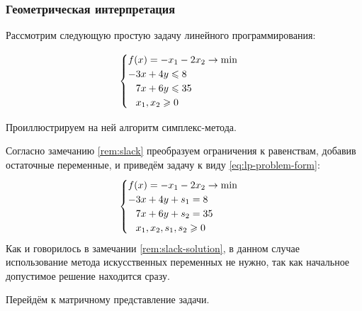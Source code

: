 \subsubsection{Геометрическая интерпретация}

Рассмотрим следующую простую задачу линейного программирования:

\begin{equation}
  \label{eq:lp-simple}
  \begin{cases}
    f(x) = -x_1-2x_2 \to \min \\
    -3x+4y \leq 8 \\
    \phm 7x+6y \leq 35 \\
    \phm x_1, x_2 \geq 0
  \end{cases}
\end{equation}

Проиллюстрируем на ней алгоритм симплекс-метода.

Согласно замечанию \ref{rem:slack} преобразуем ограничения к
равенствам, добавив остаточные переменные, и приведём задачу к виду
\eqref{eq:lp-problem-form}:
\begin{equation*}
  \begin{cases}
    f(x) = -x_1-2x_2 \to \min \\
    -3x+4y+s_1 = 8 \\
    \phm 7x+6y+s_2 = 35 \\
    \phm x_1, x_2, s_1, s_2 \geq 0
  \end{cases}
\end{equation*}
Как и говорилось в замечании \ref{rem:slack-solution}, в данном случае
использование метода искусственных переменных не нужно, так как
начальное допустимое решение находится сразу.

Перейдём к матричному представление задачи.

